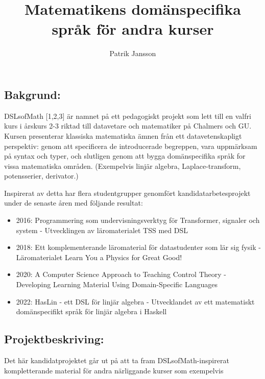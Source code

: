 \documentclass{article}
\author{}
\date{}
\title{Matematikens domänspecifika språk för andra kurser}
\author{Patrik Jansson}
\providecommand{\tightlist}{%
  \setlength{\itemsep}{0pt}\setlength{\parskip}{0pt}}
\begin{document}
\maketitle
\begin{abstract}

\end{abstract}



\subsection{Bakgrund:}\label{bakgrund}

DSLsofMath {[}1,2,3{]} är namnet på ett pedagogiskt projekt som lett
till en valfri kurs i årskurs 2-3 riktad till datavetare och matematiker
på Chalmers och GU. Kursen presenterar klassiska matematiska ämnen från
ett datavetenskapligt perspektiv: genom att specificera de introducerade
begreppen, vara uppmärksam på syntax och typer, och slutligen genom att
bygga domänspecifika språk for vissa matematiska områden. (Exempelvis
linjär algebra, Laplace-transform, potensserier, derivator.)

Inspirerat av detta har flera studentgrupper genomfört
kandidatarbetesprojekt under de senaste åren med följande resultat:

\begin{itemize}
\tightlist
\item
  2016: Programmering som undervisningsverktyg för Transformer, signaler
  och system - Utvecklingen av läromaterialet TSS med DSL
\item
  2018: Ett komplementerande läromaterial för datastudenter som lär sig
  fysik - Läromaterialet Learn You a Physics for Great Good!
\item
  2020: A Computer Science Approach to Teaching Control Theory -
  Developing Learning Material Using Domain-Specific Languages
\item
  2022: HasLin - ett DSL för linjär algebra - Utvecklandet av ett
  matematiskt domänspecifikt språk för linjär algebra i Haskell
\end{itemize}

\subsection{Projektbeskriving:}\label{projektbeskriving}

Det här kandidatprojektet går ut på att ta fram DSLsofMath-inspirerat
kompletterande material för andra närliggande kurser som exempelvis
\end{document}
